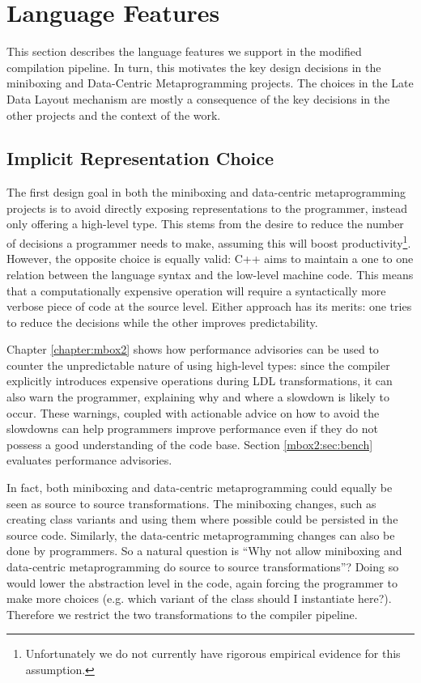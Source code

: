 \section{Language Features}

This section describes the language features we support in the modified compilation pipeline. In turn, this motivates the key design decisions in the miniboxing and Data-Centric Metaprogramming projects. The choices in the Late Data Layout mechanism are mostly a consequence of the key decisions in the other projects and the context of the work.

\subsection{Implicit Representation Choice}

The first design goal in both the miniboxing and data-centric metaprogramming projects is to avoid directly exposing representations to the programmer, instead only offering a high-level type. This stems from the desire to reduce the number of decisions a programmer needs to make, assuming this will boost productivity\footnote{Unfortunately we do not currently have rigorous empirical evidence for this assumption.}. However, the opposite choice is equally valid: C++ aims to maintain a one to one relation between the language syntax and the low-level machine code. This means that a computationally expensive operation will require a syntactically more verbose piece of code at the source level. Either approach has its merits: one tries to reduce the decisions while the other improves predictability.

Chapter \ref{chapter:mbox2} shows how performance advisories can be used to counter the unpredictable nature of using high-level types: since the compiler explicitly introduces expensive operations during LDL transformations, it can also warn the programmer, explaining why and where a slowdown is likely to occur. These warnings, coupled with actionable advice on how to avoid the slowdowns can help programmers improve performance even if they do not possess a good understanding of the code base. Section \ref{mbox2:sec:bench} evaluates performance advisories.

In fact, both miniboxing and data-centric metaprogramming could equally be seen as source to source transformations. The miniboxing changes, such as creating class variants and using them where possible could be persisted in the source code. Similarly, the data-centric metaprogramming changes can also be done by programmers. So a natural question is ``Why not allow miniboxing and data-centric metaprogramming do source to source transformations''? Doing so would lower the abstraction level in the code, again forcing the programmer to make more choices (e.g. which variant of the class should I instantiate here?). Therefore we restrict the two transformations to the compiler pipeline.

